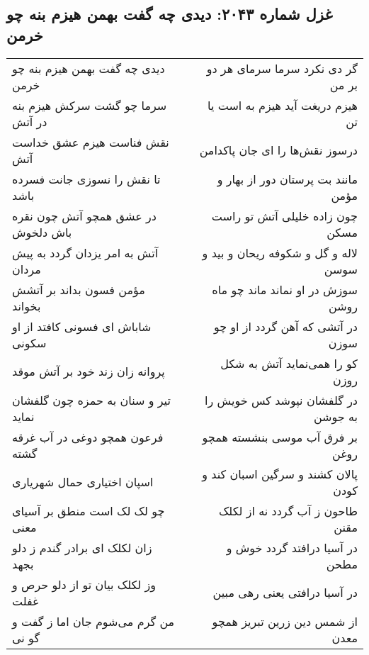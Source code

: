 \begin{center}
\section*{غزل شماره ۲۰۴۳: دیدی چه گفت بهمن هیزم بنه چو خرمن}
\label{sec:2043}
\begin{longtable}{l p{0.5cm} r}
دیدی چه گفت بهمن هیزم بنه چو خرمن
&&
گر دی نکرد سرما سرمای هر دو بر من
\\
سرما چو گشت سرکش هیزم بنه در آتش
&&
هیزم دریغت آید هیزم به است یا تن
\\
نقش فناست هیزم عشق خداست آتش
&&
درسوز نقش‌ها را ای جان پاکدامن
\\
تا نقش را نسوزی جانت فسرده باشد
&&
مانند بت پرستان دور از بهار و مؤمن
\\
در عشق همچو آتش چون نقره باش دلخوش
&&
چون زاده خلیلی آتش تو راست مسکن
\\
آتش به امر یزدان گردد به پیش مردان
&&
لاله و گل و شکوفه ریحان و بید و سوسن
\\
مؤمن فسون بداند بر آتشش بخواند
&&
سوزش در او نماند ماند چو ماه روشن
\\
شاباش ای فسونی کافتد از او سکونی
&&
در آتشی که آهن گردد از او چو سوزن
\\
پروانه زان زند خود بر آتش موقد
&&
کو را همی‌نماید آتش به شکل روزن
\\
تیر و سنان به حمزه چون گلفشان نماید
&&
در گلفشان نپوشد کس خویش را به جوشن
\\
فرعون همچو دوغی در آب غرقه گشته
&&
بر فرق آب موسی بنشسته همچو روغن
\\
اسپان اختیاری حمال شهریاری
&&
پالان کشند و سرگین اسبان کند و کودن
\\
چو لک لک است منطق بر آسیای معنی
&&
طاحون ز آب گردد نه از لکلک مقنن
\\
زان لکلک ای برادر گندم ز دلو بجهد
&&
در آسیا درافتد گردد خوش و مطحن
\\
وز لکلک بیان تو از دلو حرص و غفلت
&&
در آسیا درافتی یعنی رهی مبین
\\
من گرم می‌شوم جان اما ز گفت و گو نی
&&
از شمس دین زرین تبریز همچو معدن
\\
\end{longtable}
\end{center}
